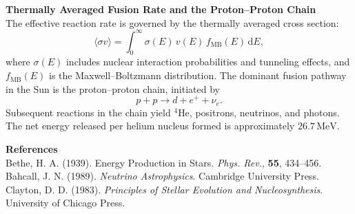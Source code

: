 \begin{technical}
    \vspace{0.7em}
    \textbf{Thermally Averaged Fusion Rate and the Proton–Proton Chain}\\[0.5em]
    The effective reaction rate is governed by the thermally averaged cross section:
    \[
    \langle \sigma v \rangle = \int_0^\infty \sigma(E)\, v(E)\, f_\text{MB}(E)\, \mathrm{d}E,
    \]
    where \(\sigma(E)\) includes nuclear interaction probabilities and tunneling effects, and \(f_\text{MB}(E)\) is the Maxwell–Boltzmann distribution. The dominant fusion pathway in the Sun is the proton–proton chain, initiated by
    \[
    p + p \to d + e^+ + \nu_e.
    \]
    Subsequent reactions in the chain yield \( ^4\text{He} \), positrons, neutrinos, and photons. The net energy released per helium nucleus formed is approximately \(26.7\,\text{MeV}\).
    
    \vspace{0.7em}
    \vspace{0.5em}
    \textbf{References}\\
    Bethe, H. A. (1939). Energy Production in Stars. \textit{Phys. Rev.}, \textbf{55}, 434–456.\\
    Bahcall, J. N. (1989). \textit{Neutrino Astrophysics}. Cambridge University Press.\\
    Clayton, D. D. (1983). \textit{Principles of Stellar Evolution and Nucleosynthesis}. University of Chicago Press.
    \end{technical}
    